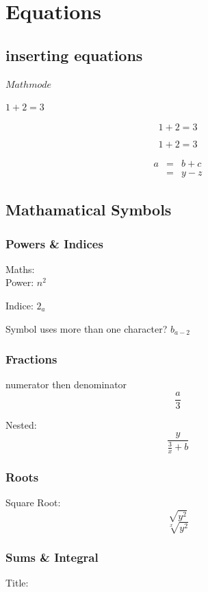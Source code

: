 \documentclass[a4paper,12pt]{article}
\begin{document}
\section{Equations}
\subsection{inserting equations}
$Math mode$

$1+2=3$

$$1+2=3$$

\begin{equation}
1+2=3
\end{equation}

\begin{eqnarray*}
a & = & b + c \\
   & = & y - z
\end{eqnarray*}


\newpage
\newpage

\subsection{Mathamatical Symbols}
\subsubsection{Powers \& Indices}

Maths:
\\

Power:     
$n^2$

Indice: 
$2_a$

Symbol uses more than one character? 
$b_{a-2}$

\subsubsection{Fractions}
numerator then 
denominator
$$\frac{a}{3}$$

Nested:
$$\frac{y}{\frac{3}{x}+b}$$

\subsubsection{Roots}
Square Root:
$$\sqrt{y^2}$$
$$\sqrt[x]{y^2}$$


\subsubsection{Sums \& Integral}
Title:
\end{document}
